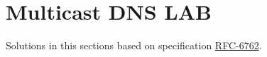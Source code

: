 \section{Multicast DNS LAB}
Solutions in this sections based on specification \href{https://tools.ietf.org/html/rfc6762}{RFC-6762}.